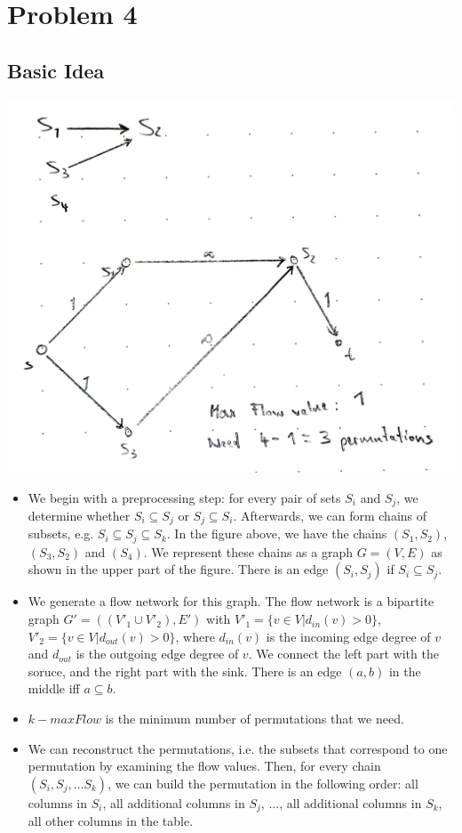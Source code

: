 \documentclass[12pt]{article}
\begin{document}
\section*{Problem 4}
\subsection*{Basic Idea}
\includegraphics[width=\textwidth]{4.pdf}
\begin{itemize}
	\item We begin with a preprocessing step: for every pair of sets $S_i$ and $S_j$, we determine whether $S_i \subseteq S_j$ or $S_j \subseteq S_i$. Afterwards, we can form chains of subsets, e.g. $S_i \subseteq S_j \subseteq S_k$. In the figure above, we have the chains $(S_1, S_2)$, $(S_3, S_2)$ and $(S_4)$. We represent these chains as a graph $G=(V, E)$ as shown in the upper part of the figure. There is an edge $(S_i, S_j)$ if $S_i  \subseteq S_j$.
	\item We generate a flow network for this graph. The flow network is a bipartite graph $G' = ((V'_1 \cup V'_2), E')$ with $V'_1 = \{v \in V \left. \right| d_{\mathit{in}}(v) > 0 \}$, $V'_2 = \{v \in V \left. \right| d_\mathit{out}(v) > 0\}$, where $d_\mathit{in}(v)$ is the incoming edge degree of $v$ and $d_\mathit{out}$ is the outgoing edge degree of $v$. We connect the left part with the soruce, and the right part with the sink. There is an edge $(a,b)$ in the middle iff $a \subseteq b$.
	\item $k - \mathit{maxFlow}$ is the minimum number of permutations that we need.
	\item We can reconstruct the permutations, i.e. the subsets that correspond to one permutation by examining the flow values. Then, for every chain $(S_i, S_j, \ldots S_k)$, we can build the permutation in the following order: all columns in $S_i$, all additional columns in $S_j$, $\ldots$, all additional columns in $S_k$, all other columns in the table.
\end{itemize}
\end{document}
